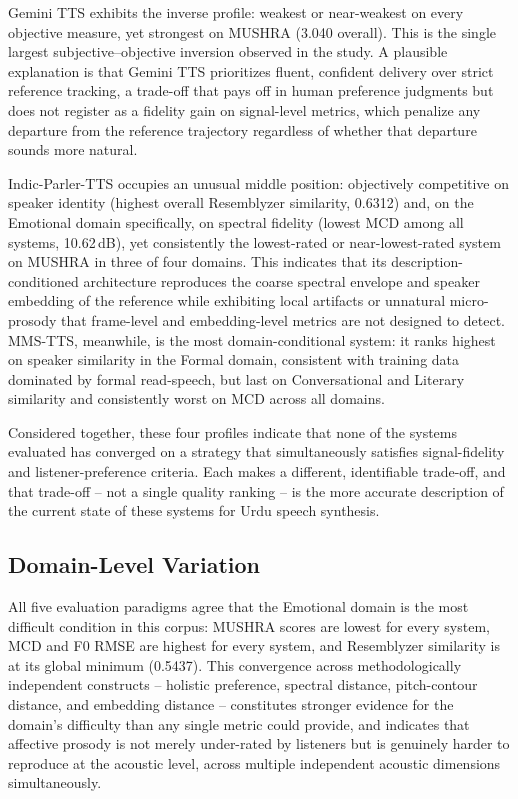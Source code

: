 \documentclass[a4paper,fleqn]{cas-dc}
\begin{document}
    \hspace*{1.2em} Gemini TTS exhibits the inverse profile: weakest or near-weakest on every
    objective measure, yet strongest on MUSHRA (3.040 overall). This is the
    single largest subjective–objective inversion observed in the study. A
    plausible explanation is that Gemini TTS prioritizes fluent, confident
    delivery over strict reference tracking, a trade-off that pays off in
    human preference judgments but does not register as a fidelity gain on
    signal-level metrics, which penalize any departure from the reference
    trajectory regardless of whether that departure sounds more natural.
    
    \hspace*{1.2em} Indic-Parler-TTS occupies an unusual middle position: objectively competitive on speaker identity (highest overall Resemblyzer similarity, 0.6312) and, on the Emotional domain specifically, on spectral fidelity (lowest MCD among all systems, 10.62\,dB), yet consistently the
    lowest-rated or near-lowest-rated system on MUSHRA in three of four
    domains. This indicates that its description-conditioned architecture
    reproduces the coarse spectral envelope and speaker embedding of the
    reference while exhibiting local artifacts or unnatural micro-prosody
    that frame-level and embedding-level metrics are not designed to detect.
    MMS-TTS, meanwhile, is the most domain-conditional system: it ranks
    highest on speaker similarity in the Formal domain, consistent with
    training data dominated by formal read-speech, but last on Conversational
    and Literary similarity and consistently worst on MCD across all domains.
    
    \hspace*{1.2em} Considered together, these four profiles indicate that none of the systems evaluated has converged on a strategy that simultaneously
    satisfies signal-fidelity and listener-preference criteria. Each makes a
    different, identifiable trade-off, and that trade-off -- not a single
    quality ranking -- is the more accurate description of the current state
    of these systems for Urdu speech synthesis.
    
    \subsection{Domain-Level Variation}\label{sec:discussion-domain}
    
    \hspace*{1.2em} All five evaluation paradigms agree that the Emotional domain is the most difficult condition in this corpus: MUSHRA scores are lowest for every system, MCD and F0 RMSE are highest for every system, and Resemblyzer similarity is at its global minimum (0.5437). This convergence across methodologically independent constructs -- holistic preference,
    spectral distance, pitch-contour distance, and embedding distance --
    constitutes stronger evidence for the domain's difficulty than any single
    metric could provide, and indicates that affective prosody is not merely
    under-rated by listeners but is genuinely harder to reproduce at the
    acoustic level, across multiple independent acoustic dimensions
    simultaneously.
    
\end{document}
